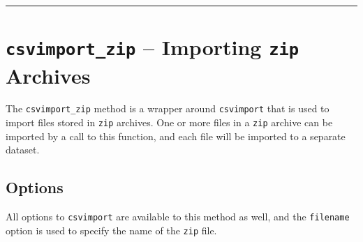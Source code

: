 



\par\noindent\rule{\textwidth}{0.4pt}

\section{\texttt{csvimport\_zip} -- Importing \texttt{zip} Archives}
The \texttt{csvimport\_zip} method is a wrapper
around \texttt{csvimport} that is used to import files stored in
\texttt{zip} archives.  One or more files in a \texttt{zip} archive
can be imported by a call to this function, and each file will be
imported to a separate dataset.


\subsection{Options}

All options to \texttt{csvimport} are available to this method as
well, and the \texttt{filename} option is used to specify the name of
the \texttt{zip} file.

